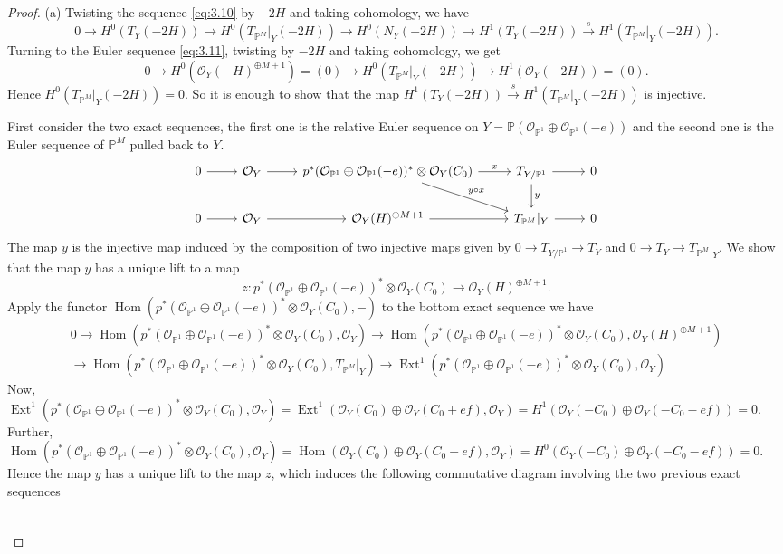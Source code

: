 \documentclass[11pt,reqno]{amsart}
\theoremstyle{plain}
\theoremstyle{definition}
\newcommand{\PP}{\mathbb{P}}
\newcommand{\PM}{\mathbb{P}^M}
\newcommand{\OO}{\mathcal{O}}
\newcommand{\Hom}{\operatorname{Hom}}
\newcommand{\Ext}{\operatorname{Ext}}
\newcommand{\NY}{N_{Y}}
\newcommand{\TP}{T_{\PM}|_Y}
\begin{document}
\begin{proof}
(a) Twisting the sequence \eqref{eq:3.10} by $-2H$ and taking cohomology, we have
\[
0\to H^0(T_Y(-2H))\to H^0(\TP(-2H))\to H^0(\NY(-2H))\to H^1(T_Y(-2H))\xrightarrow{\ s\ }H^1(\TP(-2H)) .
\]
Turning to the Euler sequence \eqref{eq:3.11}, twisting by $-2H$ and taking cohomology, we get
\[
0\to H^0(\OO_Y(-H)^{\oplus M+1})=(0)\to H^0(\TP(-2H))\to H^1(\OO_Y(-2H))=(0) .
\]
Hence $H^0(\TP(-2H))=0$. So it is enough to show that the map $H^1(T_Y(-2H))\xrightarrow{\ s\ }H^1(\TP(-2H))$ is injective.

First consider the two exact sequences, the first one is the relative Euler sequence on $Y=\PP(\OO_{\PP^1}\oplus\OO_{\PP^1}(-e))$ and the second one is the Euler sequence of $\PM$ pulled back to $Y$.
\[
\begin{tikzcd}
  0 \arrow[r] & \OO_Y \arrow[r] & p^*(\OO_{\PP^1} \oplus \OO_{\PP^1}(-e))^* \otimes \OO_{Y}(C_0) \arrow[r, "x"] \arrow[dr, "y \circ x"] & T_{Y/\PP^1} \arrow[r] \arrow[d, "y"] & 0 \\
   0 \arrow[r] & \OO_Y \arrow[r] & \OO_Y(H)^{\oplus M+1} \arrow[r] & \TP \arrow[r] & 0
\end{tikzcd}
\]
The map $y$ is the injective map induced by the composition of two injective maps given by $0\to T_{Y/\PP^1}\to T_Y$ and $0\to T_Y\to\TP$. We show that the map $y$ has a unique lift to a map
\[
z\colon p^*(\OO_{\PP^1}\oplus\OO_{\PP^1}(-e))^*\otimes\OO_Y(C_0)\to\OO_Y(H)^{\oplus M+1} .
\]
Apply the functor $\Hom(p^*(\OO_{\PP^1}\oplus\OO_{\PP^1}(-e))^*\otimes\OO_Y(C_0),-)$ to the bottom exact sequence we have
\begin{multline*}
0\to\Hom(p^*(\OO_{\PP^1}\oplus\OO_{\PP^1}(-e))^*\otimes\OO_Y(C_0),\OO_Y)\to\Hom(p^*(\OO_{\PP^1}\oplus\OO_{\PP^1}(-e))^*\otimes\OO_Y(C_0),\OO_Y(H)^{\oplus M+1})\\
\to\Hom(p^*(\OO_{\PP^1}\oplus\OO_{\PP^1}(-e))^*\otimes\OO_Y(C_0),\TP)\to\Ext^1(p^*(\OO_{\PP^1}\oplus\OO_{\PP^1}(-e))^*\otimes\OO_Y(C_0),\OO_Y)
\end{multline*}
Now, $\Ext^1(p^*(\OO_{\PP^1}\oplus\OO_{\PP^1}(-e))^*\otimes\OO_Y(C_0),\OO_Y)=\Ext^1(\OO_Y(C_0)\oplus\OO_Y(C_0+ef),\OO_Y)=H^1(\OO_Y(-C_0)\oplus\OO_Y(-C_0-ef))=0$. Further, $\Hom(p^*(\OO_{\PP^1}\oplus\OO_{\PP^1}(-e))^*\otimes\OO_Y(C_0),\OO_Y)=\Hom(\OO_Y(C_0)\oplus\OO_Y(C_0+ef),\OO_Y)=H^0(\OO_Y(-C_0)\oplus\OO_Y(-C_0-ef))=0$. Hence the map $y$ has a unique lift to the map $z$, which induces the following commutative diagram involving the two previous exact sequences
\begin{equation}\label{diag:relEuler}
\begin{tikzcd}

\end{tikzcd}
\end{equation}
\end{proof}
\end{document}
